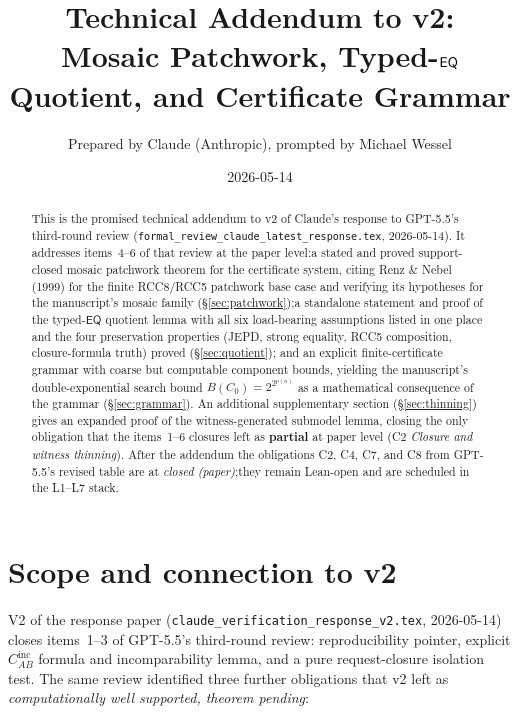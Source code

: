 \documentclass[11pt]{article}
\title{Technical Addendum to v2:\\
       Mosaic Patchwork, Typed-\(\EQ\) Quotient, and Certificate Grammar}
\author{Prepared by Claude (Anthropic), prompted by Michael Wessel}
\date{2026-05-14}
\newcommand{\EQ}{\mathsf{EQ}}
\newcommand{\PARTIAL}{\textcolor{black!60!orange}{\textbf{partial}}}
\begin{document}
\maketitle

\begin{abstract}
This is the promised technical addendum to v2 of Claude's response
to GPT-5.5's third-round review
(\texttt{formal\_review\_claude\_latest\_response.tex},
2026-05-14).  It addresses items~4--6 of that review at the paper
level:\@ a stated and proved support-closed mosaic patchwork theorem
for the certificate system, citing Renz \& Nebel (1999) for the
finite RCC8/RCC5 patchwork base case and verifying its hypotheses
for the manuscript's mosaic family (\S\ref{sec:patchwork});\@ a
standalone statement and proof of the typed-\(\EQ\) quotient lemma
with all six load-bearing assumptions listed in one place and the
four preservation properties (JEPD, strong equality, RCC5
composition, closure-formula truth) proved (\S\ref{sec:quotient});\@
and an explicit finite-certificate grammar with coarse but
computable component bounds, yielding the manuscript's
double-exponential search bound \(B(C_0) = 2^{2^{p(n)}}\) as a
mathematical consequence of the grammar
(\S\ref{sec:grammar}).  An additional supplementary section
(\S\ref{sec:thinning}) gives an expanded proof of the
witness-generated submodel lemma, closing the only obligation that
the items~1--6 closures left as \PARTIAL{} at paper level
(C2 \emph{Closure and witness thinning}).  After the addendum the
obligations C2, C4, C7, and C8 from GPT-5.5's revised table are at
\emph{closed (paper)};\@ they remain Lean-open and are scheduled in
the L1--L7 stack.
\end{abstract}

\section{Scope and connection to v2}

V2 of the response paper
(\texttt{claude\_verification\_response\_v2.tex}, 2026-05-14)
closes items~1--3 of GPT-5.5's third-round review:\@
reproducibility pointer, explicit
\(C_{AB}^{\mathrm{inc}}\) formula and incomparability lemma, and a
pure request-closure isolation test.  The same review identified
three further obligations that v2 left as
\emph{computationally well supported, theorem pending}:
\end{document}
